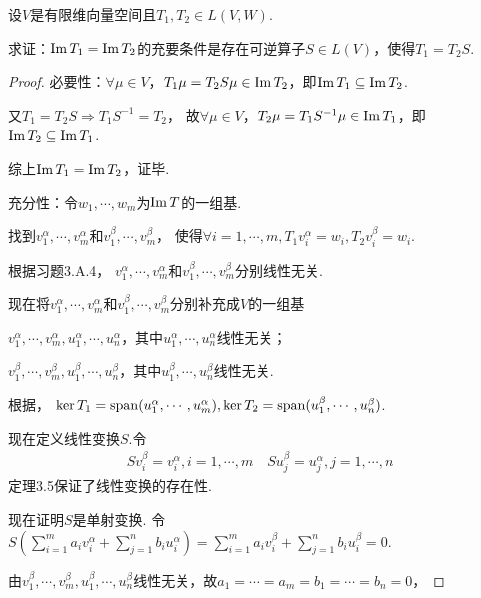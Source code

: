 \newpage

\begin{problem}[5]\label{3.D.5}
    设\(V\)是有限维向量空间且\(T_1,T_2 \in L(V,W)\).

    求证：\(\operatorname{Im} T_1=\operatorname{Im} T_2\)的充要条件是存在可逆算子\(S \in L(V)\)，使得\(T_1=T_2S\).    
\end{problem}

\begin{proof}
    必要性：\(\forall \mu \in V\)，\(T_1 \mu =T_2S \mu \in \operatorname{Im} T_2\)，即\(\operatorname{Im} T_1 \subseteq \operatorname{Im} T_2\).

    又\(T_1=T_2S \Rightarrow T_1S^{-1}=T_2\)，
    故\(\forall \mu \in V\)，\(T_2 \mu =T_1S^{-1} \mu \in \operatorname{Im} T_1\)，即\(\operatorname{Im} T_2 \subseteq \operatorname{Im} T_1\).
    
    综上\(\operatorname{Im} T_1=\operatorname{Im} T_2\)，证毕.
    
    充分性：令\(w_1,\cdots,w_m\)为\(\operatorname{Im} T\)的一组基.
    
    找到\(v_1^\alpha,\cdots,v_m^\alpha\)和\(v_1^\beta,\cdots,v_m^\beta\)，
    使得\(\forall i=1,\cdots,m,T_1v_i^\alpha=w_i,T_2v_i^\beta=w_i\).
    
    根据习题3.A.4，
    \(v_1^\alpha,\cdots,v_m^\alpha\)和\(v_1^\beta,\cdots,v_m^\beta\)分别线性无关.
    
    现在将\(v_1^\alpha,\cdots,v_m^\alpha\)和\(v_1^\beta,\cdots,v_m^\beta\)分别补充成\(V\)的一组基
    
    \(v_1^\alpha,\cdots,v_m^\alpha,u_1^\alpha,\cdots,u_n^\alpha\)，其中\(u_1^\alpha,\cdots,u_n^\alpha\)线性无关；
    
    \(v_1^\beta,\cdots,v_m^\beta,u_1^\beta,\cdots,u_n^\beta\)，其中\(u_1^\beta,\cdots,u_n^\beta\)线性无关.
    
    根据，
    \(\ker T_1=\operatorname{span} (u_1^\alpha,\cdots,u_m^\alpha),\ker T_2=\operatorname{span} (u_1^\beta,\cdots,u_n^\beta)\).
    
    现在定义线性变换\(S\).令
    \begin{align*}
        Sv_i^\beta=v_i^\alpha,i=1,\cdots,m \quad
        Su_j^\beta=u_j^\alpha,j=1,\cdots,n
    \end{align*}
    定理3.5保证了线性变换的存在性.
    
    现在证明\(S\)是单射变换.
    令\(S(\sum_{i=1}^m a_iv_i^\alpha+\sum_{j=1}^n b_iu_i^\alpha)=\sum_{i=1}^m a_iv_i^\beta+\sum_{j=1}^n b_iu_i^\beta=0\).
    
    由\(v_1^\beta,\cdots,v_m^\beta,u_1^\beta,\cdots,u_n^\beta\)线性无关，故\(a_1=\cdots=a_m=b_1=\cdots=b_n=0\)，
    

\end{proof}
